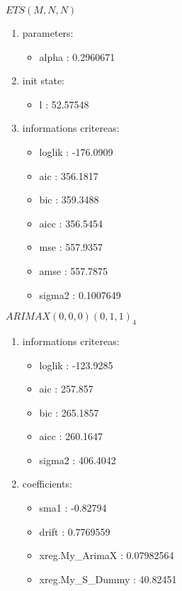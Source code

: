 \documentclass[10pt,a4paper]{article}\usepackage[]{graphicx}\usepackage[]{color}
\begin{document}
\begin{multicols}{2}


$ ETS(M,N,N) $
\begin{enumerate}
\item parameters:
\begin{itemize}
\item  alpha :  0.2960671 
\end{itemize}
\item init state:
\begin{itemize}
\item  l :  52.57548 
\end{itemize}
\item informations critereas:
\begin{itemize}
\item  loglik :  -176.0909 
\item  aic :  356.1817 
\item  bic :  359.3488 
\item  aicc :  356.5454 
\item  mse :  557.9357 
\item  amse :  557.7875 
\item  sigma2 :  0.1007649 
\end{itemize}
\end{enumerate}

\columnbreak


 $ARIMAX(0,0,0)(0,1,1)_{4}$ 
\begin{enumerate}
\item informations critereas:
\begin{itemize}
\item  loglik :  -123.9285 
\item  aic :  257.857 
\item  bic :  265.1857 
\item  aicc :  260.1647 
\item  sigma2 :  406.4042 
\end{itemize}

\item coefficients:
\begin{itemize}
\item  sma1 :  -0.82794 
\item  drift :  0.7769559 
\item  xreg.My_ArimaX :  0.07982564 
\item  xreg.My_S_Dummy :  40.82451 
\end{itemize}
\end{enumerate}
\end{multicols}
\end{document}

